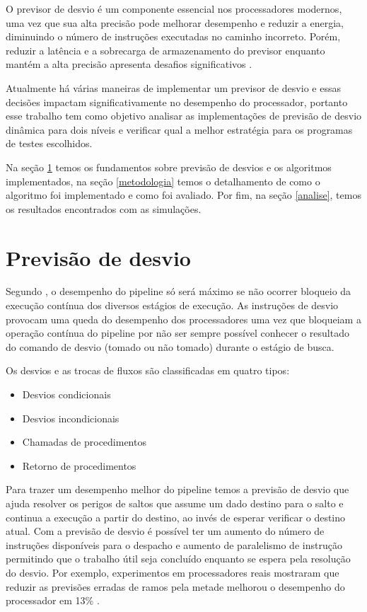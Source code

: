 \documentclass[journal, twoside]{IEEEtran}
\begin{document}
O previsor de desvio é um componente essencial nos processadores modernos, uma vez que sua alta precisão pode melhorar desempenho e reduzir a energia, diminuindo o número de instruções executadas no caminho incorreto. Porém, reduzir a latência e a sobrecarga de armazenamento do previsor enquanto mantém a alta precisão apresenta desafios significativos \cite{mitall}.

Atualmente há várias maneiras de implementar um previsor de desvio e essas decisões impactam significativamente no desempenho do processador, portanto esse trabalho tem como objetivo analisar as implementações de previsão de desvio dinâmica para dois níveis e verificar qual a melhor estratégia para os programas de testes escolhidos.

Na seção \ref{previsao} temos os fundamentos sobre previsão de desvios e os algoritmos implementados, na seção \ref{metodologia} temos o detalhamento de como o algoritmo foi implementado e como foi avaliado. Por fim, na seção \ref{analise}, temos os resultados encontrados com as simulações.


\section{Previsão de desvio} \label{previsao}
Segundo \cite{pizzol}, o desempenho do pipeline só será máximo se não ocorrer bloqueio da execução contínua dos diversos estágios de execução. As instruções de desvio provocam uma queda do desempenho dos processadores uma vez que bloqueiam a operação contínua do pipeline por não ser sempre possível conhecer o resultado do comando de desvio (tomado ou não tomado) durante o estágio de busca.

Os desvios e as trocas de fluxos são classificadas em quatro tipos:
\begin{itemize}
    \item Desvios condicionais
    \item Desvios incondicionais
    \item Chamadas de procedimentos
    \item Retorno de procedimentos
\end{itemize}

Para trazer um desempenho melhor do pipeline temos a previsão de desvio que ajuda resolver os perigos de saltos que assume um dado destino para o salto e continua a execução a partir do destino, ao invés de esperar verificar o destino atual. Com a previsão de desvio é possível ter um aumento do número de instruções disponíveis para o despacho e aumento de paralelismo de instrução permitindo que o trabalho útil seja concluído enquanto se espera pela resolução do desvio. Por exemplo, experimentos em processadores reais mostraram que reduzir as previsões erradas de ramos pela metade melhorou o desempenho do processador em 13\%	 \cite{mitall}.
\end{document}
